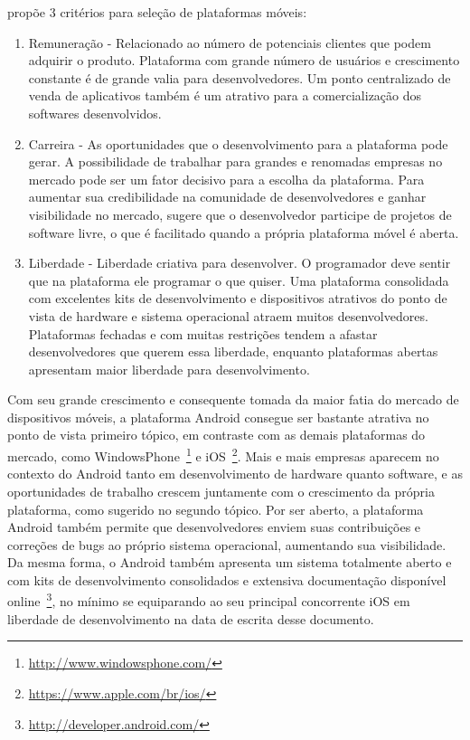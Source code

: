  propõe 3 critérios para seleção de plataformas móveis:
\begin{enumerate}
\item Remuneração - Relacionado ao número de potenciais clientes que podem adquirir o produto. Plataforma com grande número de usuários e crescimento constante é de grande valia para desenvolvedores. Um ponto centralizado de venda de aplicativos também é um atrativo para a comercialização dos softwares desenvolvidos.
\item Carreira - As oportunidades que o desenvolvimento para a plataforma pode gerar. A possibilidade de trabalhar para grandes e renomadas empresas no mercado pode ser um fator decisivo para a escolha da plataforma. Para aumentar sua credibilidade na comunidade de desenvolvedores e ganhar visibilidade no mercado,  sugere que o desenvolvedor participe de projetos de software livre, o que é facilitado quando a própria plataforma móvel é aberta.
\item Liberdade - Liberdade criativa para desenvolver. O programador deve sentir que na plataforma ele programar o que quiser. Uma plataforma consolidada com excelentes kits de desenvolvimento e dispositivos atrativos do ponto de vista de hardware e sistema operacional atraem muitos desenvolvedores. Plataformas fechadas e com muitas restrições tendem a afastar desenvolvedores que querem essa liberdade, enquanto plataformas abertas apresentam maior liberdade para desenvolvimento.
\end{enumerate}

Com seu grande crescimento e consequente tomada da maior fatia do mercado de dispositivos móveis, a plataforma Android consegue ser bastante atrativa no ponto de vista primeiro tópico, em contraste com as demais plataformas do mercado, como WindowsPhone~\footnote{\url{http://www.windowsphone.com/}} e iOS~\footnote{\url{https://www.apple.com/br/ios/}}. Mais e mais empresas aparecem no contexto do Android tanto em desenvolvimento de hardware quanto software, e as oportunidades de trabalho crescem juntamente com o crescimento da própria plataforma, como sugerido no segundo tópico. Por ser aberto, a plataforma Android também permite que desenvolvedores enviem suas contribuições e correções de bugs ao próprio sistema operacional, aumentando sua visibilidade. Da mesma forma, o Android também apresenta um sistema totalmente aberto e com kits de desenvolvimento consolidados e extensiva documentação disponível online~\footnote{\url{http://developer.android.com/}}, no mínimo se equiparando ao seu principal concorrente iOS em liberdade de desenvolvimento na data de escrita desse documento.

